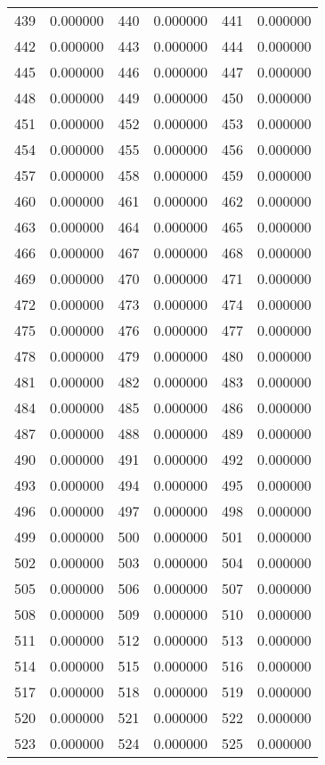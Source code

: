 \documentclass[12pt]{article}
\begin{document}
\begin{longtable}{@{}cc|cc|cc@{}}
439 & 0.000000 & 440 & 0.000000 & 441 & 0.000000 \\
442 & 0.000000 & 443 & 0.000000 & 444 & 0.000000 \\
445 & 0.000000 & 446 & 0.000000 & 447 & 0.000000 \\
448 & 0.000000 & 449 & 0.000000 & 450 & 0.000000 \\
451 & 0.000000 & 452 & 0.000000 & 453 & 0.000000 \\
454 & 0.000000 & 455 & 0.000000 & 456 & 0.000000 \\
457 & 0.000000 & 458 & 0.000000 & 459 & 0.000000 \\
460 & 0.000000 & 461 & 0.000000 & 462 & 0.000000 \\
463 & 0.000000 & 464 & 0.000000 & 465 & 0.000000 \\
466 & 0.000000 & 467 & 0.000000 & 468 & 0.000000 \\
469 & 0.000000 & 470 & 0.000000 & 471 & 0.000000 \\
472 & 0.000000 & 473 & 0.000000 & 474 & 0.000000 \\
475 & 0.000000 & 476 & 0.000000 & 477 & 0.000000 \\
478 & 0.000000 & 479 & 0.000000 & 480 & 0.000000 \\
481 & 0.000000 & 482 & 0.000000 & 483 & 0.000000 \\
484 & 0.000000 & 485 & 0.000000 & 486 & 0.000000 \\
487 & 0.000000 & 488 & 0.000000 & 489 & 0.000000 \\
490 & 0.000000 & 491 & 0.000000 & 492 & 0.000000 \\
493 & 0.000000 & 494 & 0.000000 & 495 & 0.000000 \\
496 & 0.000000 & 497 & 0.000000 & 498 & 0.000000 \\
499 & 0.000000 & 500 & 0.000000 & 501 & 0.000000 \\
502 & 0.000000 & 503 & 0.000000 & 504 & 0.000000 \\
505 & 0.000000 & 506 & 0.000000 & 507 & 0.000000 \\
508 & 0.000000 & 509 & 0.000000 & 510 & 0.000000 \\
511 & 0.000000 & 512 & 0.000000 & 513 & 0.000000 \\
514 & 0.000000 & 515 & 0.000000 & 516 & 0.000000 \\
517 & 0.000000 & 518 & 0.000000 & 519 & 0.000000 \\
520 & 0.000000 & 521 & 0.000000 & 522 & 0.000000 \\
523 & 0.000000 & 524 & 0.000000 & 525 & 0.000000 \\

\end{longtable}
\end{document}
